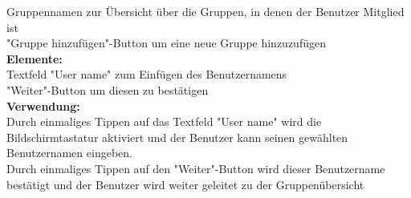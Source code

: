 Gruppennamen zur Übersicht über die Gruppen, in denen der Benutzer Mitglied ist\\
"Gruppe hinzufügen"-Button um eine neue Gruppe hinzuzufügen\\
\textbf{Elemente:}\\
Textfeld "User name" zum Einfügen des Benutzernamens\\
"Weiter"-Button um diesen zu bestätigen\\
\textbf{Verwendung:}\\
Durch einmaliges Tippen auf das Textfeld "User name" wird die Bildschirmtastatur aktiviert und der Benutzer kann seinen gewählten Benutzernamen eingeben.\\
Durch einmaliges Tippen auf den "Weiter"-Button wird dieser Benutzername bestätigt und der Benutzer wird weiter geleitet zu der Gruppenübersicht\\ \\

